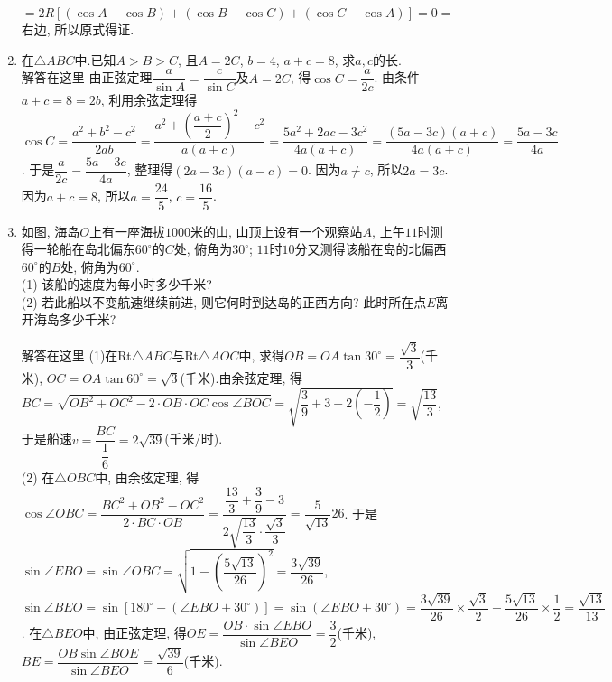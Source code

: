 \documentclass[10pt,a4paper]{article}
\begin{document}
\begin{enumerate}[1.]
$=2R[(\cos A-\cos B)+(\cos B-\cos C)+(\cos C-\cos A)]=0=$右边, 所以原式得证.
\item 在$\triangle ABC$中.已知$A>B>C$, 且$A=2C$, $b=4$, $a+c=8$, 求$a,c$的长.\\
解答在这里 由正弦定理$\dfrac a{\sin A}=\dfrac c{\sin C}$及$A=2C$, 得$\cos C=\dfrac a{2c}$.
由条件$a+c=8=2b$, 利用余弦定理得
$\cos C=\dfrac{a^2+b^2-c^2}{2ab}=\dfrac{a^2+(\dfrac{a+c}2)^2-c^2}{a(a+c)}=\dfrac{5a^2+2ac-3c^2}{4a(a+c)}=\dfrac {(5a-3c)(a+c)}{4a(a+c)}=\dfrac{5a-3c}{4a}$.
于是$\dfrac a{2c}=\dfrac{5a-3c}{4a}$, 整理得$(2a-3c)(a-c)=0$.
因为$a\ne c$, 所以$2a=3c$.因为$a+c=8$, 所以$a=\dfrac{24}5$, $c=\dfrac{16}5$.
\item 如图, 海岛$O$上有一座海拔$1000$米的山, 山顶上设有一个观察站$A$, 上午$11$时测得一轮船在岛北偏东$60^\circ$的$C$处, 俯角为$30^\circ$; $11$时$10$分又测得该船在岛的北偏西$60^\circ$的$B$处, 俯角为$60^\circ$.\\
(1) 该船的速度为每小时多少千米?\\
(2) 若此船以不变航速继续前进, 则它何时到达岛的正西方向? 此时所在点$E$离开海岛多少千米?
\begin{center}
\end{center}
解答在这里 (1)在Rt$\triangle ABC$与Rt$\triangle AOC$中, 求得$OB=OA\tan 30^\circ =\dfrac{\sqrt 3}3$(千米),
$OC=OA\tan 60^{\circ}=\sqrt 3$(千米).由余弦定理, 得
$BC=\sqrt {OB^2+OC^2-2\cdot OB\cdot OC\cos \angle BOC}=\sqrt {\dfrac 39+3-2(-\dfrac 12)}=\sqrt {\dfrac{13}3}$, 于是船速$v=\dfrac{BC}{\dfrac 16}=2\sqrt {39}$(千米/时).\\
(2) 在$\triangle OBC$中, 由余弦定理, 得$\cos \angle OBC=\dfrac{BC^2+OB^2-OC^2}{2\cdot BC\cdot OB}=\dfrac{\dfrac{13}3+\dfrac 39-3}{2\sqrt {\dfrac{13}3}\cdot \dfrac{\sqrt 3}3}=\dfrac 5{\sqrt {13}}{26}$.
于是$\sin \angle EBO=\sin \angle OBC=\sqrt {1-(\dfrac{5\sqrt {13}}{26})^2}=\dfrac{3\sqrt {39}}{26}$,
$\sin \angle BEO=\sin [180^\circ -(\angle EBO+30^\circ)]=\sin (\angle EBO+30^\circ)=\dfrac{3\sqrt {39}}{26}\times \dfrac{\sqrt 3}2-\dfrac{5\sqrt {13}}{26}\times \dfrac 12=\dfrac{\sqrt {13}}{13}$. 在$\triangle BEO$中, 由正弦定理, 得$OE=\dfrac{OB\cdot \sin \angle EBO}{\sin \angle BEO}=\dfrac 32$(千米), $BE=\dfrac{OB\sin \angle BOE}{\sin \angle BEO}=\dfrac{\sqrt {39}}6$(千米).

\end{enumerate}
\end{document}
